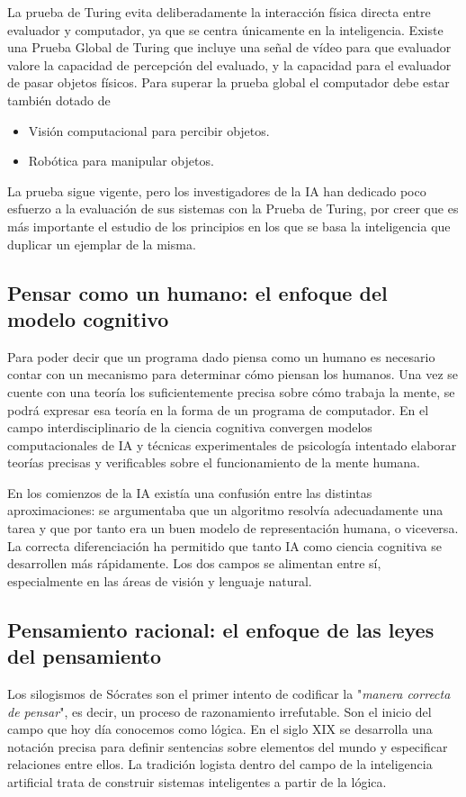 \documentclass[12pt,a4paper]{article}
\begin{document}
La prueba de Turing evita deliberadamente la interacción física directa entre evaluador y computador, ya que se centra únicamente en la inteligencia. Existe una Prueba Global de Turing que incluye una señal de vídeo para que evaluador valore la capacidad de percepción del evaluado, y la capacidad para el evaluador de pasar objetos físicos. Para superar la prueba global el computador debe estar también dotado de

\begin{itemize}
\item Visión computacional para percibir objetos.
\item Robótica para manipular objetos.
\end{itemize}

La prueba sigue vigente, pero los investigadores de la IA han dedicado poco esfuerzo a la evaluación de sus sistemas con la Prueba de Turing, por creer que es más importante el estudio de los principios en los que se basa la inteligencia que duplicar un ejemplar de la misma.

\subsection{Pensar como un humano: el enfoque del modelo cognitivo}
Para poder decir que un programa dado piensa como un humano es necesario contar con un mecanismo para determinar cómo piensan los humanos. Una vez se cuente con una teoría los suficientemente precisa sobre cómo trabaja la mente, se podrá expresar esa teoría en la forma de un programa de computador. En el campo interdisciplinario de la ciencia cognitiva convergen modelos computacionales de IA y técnicas experimentales de psicología intentado elaborar teorías precisas y verificables sobre el funcionamiento de la mente humana.

En los comienzos de la IA existía una confusión entre las distintas aproximaciones: se argumentaba que un algoritmo resolvía adecuadamente una tarea y que por tanto era un buen modelo de representación humana, o viceversa. La correcta diferenciación ha permitido que tanto IA como ciencia cognitiva se desarrollen más rápidamente. Los dos campos se alimentan entre sí, especialmente en las áreas de visión y lenguaje natural.

\subsection{Pensamiento racional: el enfoque de las leyes del pensamiento}
Los silogismos de Sócrates son el primer intento de codificar la "\emph{manera correcta de pensar}", es decir, un proceso de razonamiento irrefutable. Son el inicio del campo que hoy día conocemos como lógica. En el siglo XIX se desarrolla una notación precisa para definir sentencias sobre elementos del mundo y especificar relaciones entre ellos. La tradición logista dentro del campo de la inteligencia artificial trata de construir sistemas inteligentes a partir de la lógica.
\end{document}
